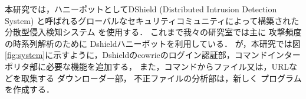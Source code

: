\documentclass[dvipdfmx]{bta}
\begin{document}



本研究では，ハニーポットとしてDShield
(Distributed Intrusion Detection System)\cite{DShield}
と呼ばれるグローバルなセキュリティコミュニティによって構築された分散型侵入検知システム
を使用する．
これまで我々の研究室では主に
攻撃頻度の時系列解析のために
Dshieldハニーポットを利用している\cite{nishida2022}．
が，本研究では図\ref{fig:system}に示すように，Dshieldのcowrie\cite{Cowrie}のログイン認証部，コマンドインターポリタ部に必要な機能を追加する，
また，コマンドからファイル又は，URLなどを取集する
ダウンローダー部，
不正ファイルの分析部は，新しく
プログラムを作成する．
\end{document}

